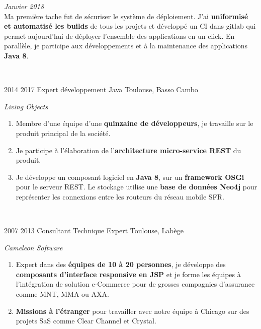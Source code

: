 \documentclass{friggeri-cv} 	%
\begin{document}
\begin{entrylist}
{\begin{description}[leftmargin=0cm]
    \item[\hspace*{-1cm}\bodyfont{|} \normalfont \textbf{\color{orange}Tech \color{headercolor}Lead Backend}] \hfill \textit{Janvier 2018}\\
        Ma première tache fut de sécuriser le système de déploiement. J’ai \textbf{uniformisé et automatisé les builds} de tous les projets 
        et développé un CI dans gitlab qui permet aujourd’hui de déployer l'ensemble des applications en un click. En parallèle, 
        je participe aux développements et à la maintenance des applications \textbf{Java 8}. 
\end{description}
\
}

\entry
{2014  2017}
{Expert développement Java}
{Toulouse, Basso Cambo}
{\vspace{-0.4cm}\emph{Living Objects} \\
\begin{enumerate}[leftmargin=0cm]
    \item Membre d’une équipe d’une \textbf{quinzaine de développeurs}, je travaille sur le produit principal de la société.
    \item Je participe à l’élaboration de l’\textbf{architecture micro-service REST} du produit.
    \item Je développe un composant logiciel en \textbf{Java 8}, sur un \textbf{framework OSGi} pour le serveur REST. 
        Le stockage utilise une \textbf{base de données Neo4j} pour représenter les connexions entre les routeurs du réseau mobile SFR.
\end{enumerate}
\
}
\end{entrylist}
\begin{entrylist}
\entry
{2007 \ding{224} 2013}
{Consultant Technique Expert}
{Toulouse, Labège}
{\vspace{-0.4cm}\emph{Cameleon Software} \\
\begin{enumerate}[leftmargin=-0cm]
    \item Expert dans des \textbf{équipes de 10 à 20 personnes}, je développe des \textbf{composants d’interface responsive en JSP} et 
        je forme les équipes à l’intégration de solution e-Commerce pour de grosses compagnies d’assurance comme MNT, MMA ou AXA.
    \item \textbf{Missions à l’étranger} pour travailler avec notre équipe à Chicago sur des projets SaS comme Clear Channel et Crystal.
\end{enumerate}
\
}
\end{entrylist}
\end{document}
